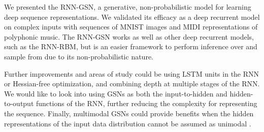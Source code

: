 We presented the RNN-GSN, a generative, non-probabilistic model for learning deep sequence representations. We validated its efficacy as a deep recurrent model on complex inputs with sequences of MNIST images and MIDI representations of polyphonic music. The RNN-GSN works as well as other deep recurrent models, such as the RNN-RBM, but is an easier framework to perform inference over and sample from due to its non-probabilistic nature.

Further improvements and areas of study could be using LSTM units in the RNN or Hessian-free optimization, and combining depth at multiple stages of the RNN. We would like to look into using GSNs as both the input-to-hidden and hidden-to-output functions of the RNN, further reducing the complexity for representing the sequence. Finally, multimodal GSNs could provide benefits when the hidden representations of the input data distribution cannot be assumed as unimodal \cite{multi_gsn}.